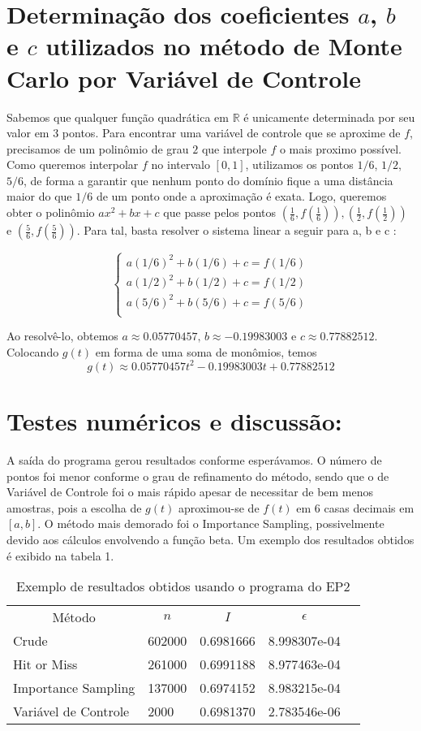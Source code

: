\documentclass[a4paper]{article}
\begin{document}
\section{Determinação dos coeficientes $a$, $b$ e $c$ utilizados no método de Monte Carlo por Variável de Controle}

	Sabemos que qualquer função quadrática em $\mathbb{R}$ é unicamente determinada por seu valor em 3 pontos. Para encontrar uma variável de controle que se aproxime de $f$, precisamos de um polinômio de grau $2$ que interpole $f$ o mais proximo possível. Como queremos interpolar $f$ no intervalo $[0,1]$, utilizamos os pontos $1/6$, $1/2$, $5/6$, de forma a garantir que nenhum ponto do domínio fique a uma distância maior do que $1/6$ de um ponto onde a aproximação é exata. Logo, queremos obter o polinômio $ax^2+bx+c$ que passe pelos pontos $(\frac{1}{6}, f(\frac{1}{6})), (\frac{1}{2},f(\frac{1}{2}))$ e $(\frac{5}{6},f(\frac{5}{6}))$. Para tal, basta resolver o sistema linear a seguir para a, b e c :
  
$$\left\{ \begin{array}{c}
a (1/6)^2 + b (1/6) + c = f(1/6)\\
a (1/2)^2 + b (1/2) + c = f(1/2)\\
a (5/6)^2 + b (5/6) + c = f(5/6)\\
\end{array}
\right.$$

Ao resolvê-lo, obtemos  $a\approx 0.05770457\textrm{, }b\approx -0.19983003\textrm{ e }c\approx 0.77882512$. Colocando $g(t)$ em forma de uma soma de monômios, temos 
\[g(t)\approx 0.05770457t^2 -0.19983003t + 0.77882512 \]

\section{Testes numéricos e discussão:}{
A saída do programa gerou resultados conforme esperávamos. O número de pontos foi menor conforme o grau de refinamento do método, sendo que o de Variável de Controle foi o mais rápido apesar de necessitar de bem menos amostras, pois a escolha de $g(t)$ aproximou-se de $f(t)$ em 6 casas decimais em $[a,b]$. O método mais demorado foi o Importance Sampling, possivelmente devido aos cálculos envolvendo a função beta. Um exemplo dos resultados obtidos é exibido na tabela 1.

\begin{table}[]
\centering
\begin{tabular}{lllll}
\multicolumn{1}{c}{Método} & \multicolumn{1}{c}{$n$} & \multicolumn{1}{c}{$I$} & \multicolumn{1}{c}{$\epsilon$} &  \\
Crude & 602000 & 0.6981666 & 8.998307e-04 &  \\
Hit or Miss & 261000 & 0.6991188 & 8.977463e-04 &  \\
Importance Sampling & 137000 & 0.6974152 & 8.983215e-04 &  \\
Variável de Controle & 2000 & 0.6981370 & 2.783546e-06 & 
\end{tabular}
\caption{Exemplo de resultados obtidos usando o programa do EP2}
\label{my-label}
\end{table}
}
\end{document}
